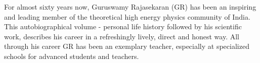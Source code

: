 \thispagestyle{empty}






\begin{figure}[H]
\end{figure}
\medskip

For almost sixty years now, Guruswamy Rajasekaran (GR) has been an inspiring and leading member of the theoretical high energy  physics community of India. This autobiographical volume - personal life history followed by his scientific work, des\-cribes his career in a refreshingly lively, direct and honest way. All through his career GR has been an exemplary teacher, especially at specialized schools for advanced students and tea\-chers.

~\thispagestyle{empty}
